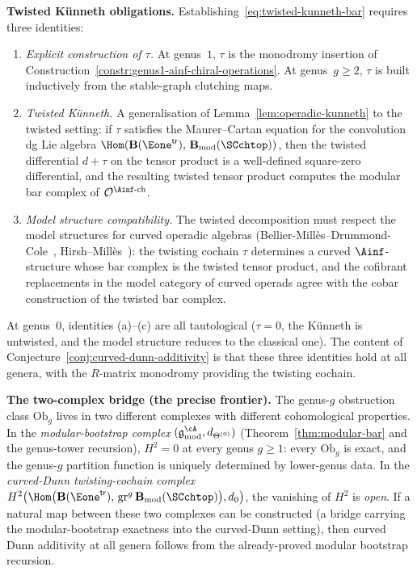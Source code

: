 \begin{remark}
\medskip\noindent
\textbf{Twisted K\"unneth obligations.}
Establishing~\eqref{eq:twisted-kunneth-bar}
requires three identities:
\begin{enumerate}[label=\textup{(\alph*)}]
\item \emph{Explicit construction of $\tau$.}
 At genus~$1$, $\tau$ is the monodromy insertion of
 Construction~\ref{constr:genus1-ainf-chiral-operations}.
 At genus~$g \ge 2$, $\tau$ is built inductively
 from the stable-graph clutching maps.
\item \emph{Twisted K\"unneth.}
 A generalisation of Lemma~\ref{lem:operadic-kunneth}
 to the twisted setting: if $\tau$ satisfies the
 Maurer--Cartan equation for the convolution dg Lie
 algebra
 $\Hom(\mathbf{B}(\Eone^{\mathsf{tr}}),\,
 \mathbf{B}_{\mathrm{mod}}(\SCchtop))$,
 then the twisted differential
 $d + \tau$ on the tensor product is a
 well-defined square-zero differential, and the
 resulting twisted tensor product computes the modular
 bar complex of $\mathcal{O}^{\Ainf\text{-ch}}$.
\item \emph{Model structure compatibility.}
 The twisted decomposition must respect the
 model structures for curved operadic algebras
 (Bellier-Mill\`es--Drummond-Cole~\cite{BMDC20},
 Hirsh--Mill\`es~\cite{HM22}): the twisting cochain
 $\tau$ determines a curved $\Ainf$-structure whose bar
 complex is the twisted tensor product, and the cofibrant
 replacements in the model category of curved operads
 agree with the cobar construction of the twisted
 bar complex.
\end{enumerate}
At genus~$0$, identities (a)--(c) are all tautological
($\tau = 0$, the K\"unneth is untwisted, and the model
structure reduces to the classical one). The content of
Conjecture~\ref{conj:curved-dunn-additivity} is that
these three identities hold at all genera, with the
$R$-matrix monodromy providing the twisting cochain.

\medskip\noindent
\textbf{The two-complex bridge (the precise frontier).}
The genus-$g$ obstruction class $\mathrm{Ob}_g$ lives in
two different complexes with different cohomological
properties. In the \emph{modular-bootstrap complex}
$(\mathfrak{g}^{\cA}_{\mathrm{mod}}, d_{\Theta^{(0)}})$
(Theorem~\ref{thm:modular-bar} and the genus-tower
recursion), $H^2 = 0$ at every genus $g \ge 1$: every
$\mathrm{Ob}_g$ is exact, and the genus-$g$ partition
function is uniquely determined by lower-genus data.
In the \emph{curved-Dunn twisting-cochain complex}
$H^2\bigl(\Hom\bigl(\mathbf{B}(\Eone^{\mathsf{tr}}),\,
\mathrm{gr}^g\,\mathbf{B}_{\mathrm{mod}}(\SCchtop)\bigr),
d_0\bigr)$, the vanishing of $H^2$ is \emph{open}.
If a natural map between these two complexes can be
constructed (a bridge carrying the modular-bootstrap
exactness into the curved-Dunn setting), then curved
Dunn additivity at all genera follows from the
already-proved modular bootstrap recursion.
\end{remark}

